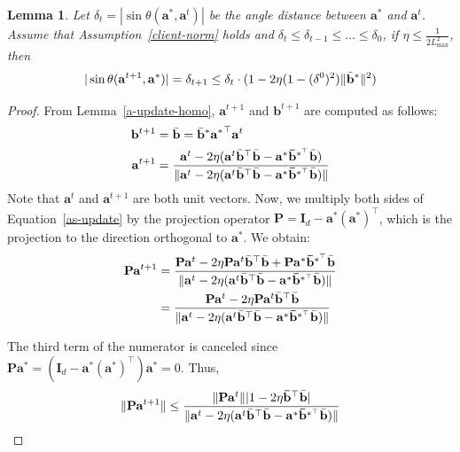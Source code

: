 \documentclass{article}
\theoremstyle{plain}
\newtheorem{lemma}[theorem]{Lemma}
\theoremstyle{definition}
\theoremstyle{remark}
\begin{document}
\begin{lemma} \label{converge-iter}
    Let $\delta_t = |\sin \theta (\mathbf{a}^*, \mathbf{a}^t)|$ be the angle distance between $\mathbf{a}^*$ and $ \mathbf{a}^t$. Assume that Assumption~\ref{client-norm} holds and $\delta_t \leq \delta_{t-1} \leq \dots \leq \delta_0$, if $\eta \leq \frac{1}{2L^2_{\max}}$, then 
    \begin{equation}
        |\sin \theta (\mathbf{a}^{t+1}, \mathbf{a}^*)| = \delta_{t+1} \leq \delta_{t} \cdot (1-2\eta (1-(\delta^0)^2) \|\Bar{\mathbf b}^*\|^2)
    \end{equation}
\end{lemma}
\begin{proof}
    From Lemma~\ref{a-update-homo}, $\mathbf{a}^{t+1}$ and $\mathbf{b}^{t+1}$ are computed as follows:
    \begin{align}
    \mathbf{b}^{t+1} &=\Bar{\mathbf{b}} = \Bar{\mathbf{b}}^*\mathbf{a^*}^\top \mathbf{a}^t \\
       \mathbf{a}^{t+1} &=  \frac{\mathbf{a}^t- 2\eta (\mathbf{a}^t\Bar{\mathbf{b}}^\top\Bar{\mathbf{b}}-\mathbf{a}^*\mathbf{\Bar{b}}^{*^\top}\Bar{\mathbf{b}})}{\lVert \mathbf{a}^t- 2\eta (\mathbf{a}^t\Bar{\mathbf{b}}^\top\Bar{\mathbf{b}}-\mathbf{a}^*\mathbf{\Bar{b}}^{*^\top}\Bar{\mathbf{b}})\rVert}\label{as-update}
    \end{align}
    Note that $\mathbf{a}^t$ and $\mathbf{a}^{t+1}$ are both unit vectors. Now, we multiply both sides of Equation~\eqref{as-update} by the projection operator $\mathbf{P} = \mathbf{I}_d-\mathbf{a}^*(\mathbf{a}^*)^\top$, which is the projection to the direction orthogonal to $\mathbf{a}^*$. We obtain:
    \begin{align}
        \mathbf{P}\mathbf{a}^{t+1} &= \frac{\mathbf{P}\mathbf{a}^t- 2\eta \mathbf{P}\mathbf{a}^t \Bar{\mathbf{b}}^\top\Bar{\mathbf{b}}+\mathbf{P}\mathbf{a}^*\mathbf{\Bar{b}}^{*^\top}\Bar{\mathbf{b}}}{\lVert \mathbf{a}^t- 2\eta (\mathbf{a}^t\Bar{\mathbf{b}}^\top\Bar{\mathbf{b}}-\mathbf{a}^*\mathbf{\Bar{b}}^{*^\top}\Bar{\mathbf{b}})\rVert} \label{projection} \\
        & = \frac{\mathbf{P}\mathbf{a}^t- 2\eta \mathbf{P}\mathbf{a}^t\Bar{\mathbf{b}}^\top\Bar{\mathbf{b}}}{\lVert \mathbf{a}^t- 2\eta (\mathbf{a}^t\Bar{\mathbf{b}}^\top\Bar{\mathbf{b}}-\mathbf{a}^*\mathbf{\Bar{b}}^{*^\top}\Bar{\mathbf{b}})\rVert} \label{proj-simp}
    \end{align}

    The third term of the numerator is canceled since $\mathbf{P}\mathbf{a}^* = (\mathbf{I}_d-\mathbf{a}^*(\mathbf{a}^*)^\top)\mathbf{a}^*=0$. Thus,
    \begin{equation}
        \|\mathbf{P}\mathbf{a}^{t+1}\| \leq \frac{\|\mathbf{P}\mathbf{a}^t\| |1- 2\eta \mathbf{\Bar{b}}^{\top}\Bar{\mathbf{b}}|}{\lVert \mathbf{a}^t- 2\eta (\mathbf{a}^t\Bar{\mathbf{b}}^\top\Bar{\mathbf{b}}-\mathbf{a}^*\mathbf{\Bar{b}}^{*^\top}\Bar{\mathbf{b}})\rVert}
    \end{equation}
    

\end{proof}
\end{document}
